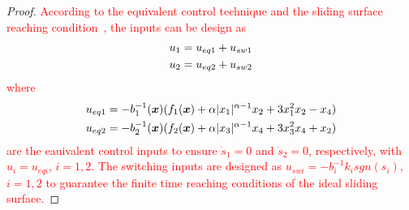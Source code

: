 \documentclass[3p]{elsarticle}
\theoremstyle{plain}
\theoremstyle{remark}
\begin{document}
\begin{proof}
\textcolor{red}{According to the equivalent control technique and the sliding surface reaching condition~\cite{Arie1993sliding}, the inputs can be design as
\begin{align}\begin{split}
u_1 &= u_{eq1}+u_{sw1}\\
u_2 &= u_{eq2}+u_{sw2}\notag
\end{split}\end{align}
where
\begin{align}\begin{split}
u_{eq1} &= -b_1^{-1}(\bm x)(f_1(\bm x)+\alpha\vert x_1\vert^{\alpha-1}x_2+3x_1^2x_2-x_4)\\
u_{eq2} &= -b_2^{-1}(\bm x)(f_2(\bm x)+\alpha\vert x_3\vert^{\alpha-1}x_4+3x_3^2x_4+x_2)\notag
\end{split}\end{align}
are the eauivalent control inputs to ensure $\dot s_1 = 0$ and $\dot s_2=0$, respectively, with $u_i = u_{eqi}$, $i=1,2$. The switching inputs are designed as $u_{swi}=-b_i^{-1}k_isgn(s_i)$, $i=1,2$ to guarantee the finite time reaching conditions of the ideal sliding surface.}


\end{proof}
\end{document}

